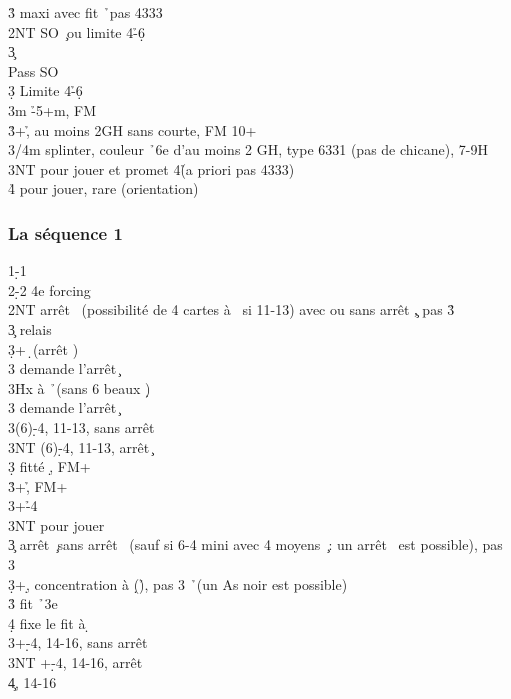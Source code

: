 \documentclass[a4paper]{article}
\begin{document}
\begin{bidtable}
3\h \> maxi avec fit \h\ pas 4333\-\\
2NT \> SO \c\ ou limite 4\h -6\d \+\\
3\c\+\\
Pass \> SO \c \\
3\d \> Limite 4\h -6\d \-\-\\
3m \h -5+m, FM\\
3\h {}+\h , au moins 2GH sans courte, FM 10+\\
3\s/4m \> splinter, couleur \h\ 6e d’au moins 2 GH, type 6331 (pas de chicane), 7-9H\\
3NT \> pour jouer et promet 4\h (a priori pas 4333)\\
4\h \> pour jouer, rare (orientation)\-
\end{bidtable}

\subsubsection{La séquence 1\pdfs}

\begin{bidtable}
1\d-1\s\\
2\d-2\s \> 4e forcing\\
2NT \> arrêt \s\ (possibilité de 4 cartes à \s\ si 11-13) avec ou sans arrêt \c , pas 3\h \+\\
3\c \> relais\+\\
3\d {}+\d\ (arrêt \s )\+\\
3\s \> demande l’arrêt \c \-\\
3\h	Hx \> à \h\ (sans 6 beaux \d )\+\\
3\s \> demande l’arrêt \c \-\\
3\s {}(6)\d -4\s , 11-13, sans arrêt \c \\
3NT (6)\d -4\s , 11-13, arrêt \c \-\\
3\d \> fitté \d , FM+\\
3\h {}+\h , FM+\\
3\s {}+\h -4\c \\
3NT \> pour jouer\-\\
3\c \> arrêt \c\ sans arrêt \s\ (sauf si 6-4 mini avec 4 moyens \c\ : un arrêt \s\ est possible), pas 3\h \\
3\d {}+\d , concentration à \d (\h ), pas 3 \h\ (un As noir est possible)\\
3\h \> fit \h\ 3e\+\\
4\d \> fixe le fit à \d \-\\
3\s {}+\d -4\s , 14-16, sans arrêt \c \\
3NT +\d -4\s , 14-16, arrêt \c \\
4\c {}, 14-16
\end{bidtable}
\end{document}
